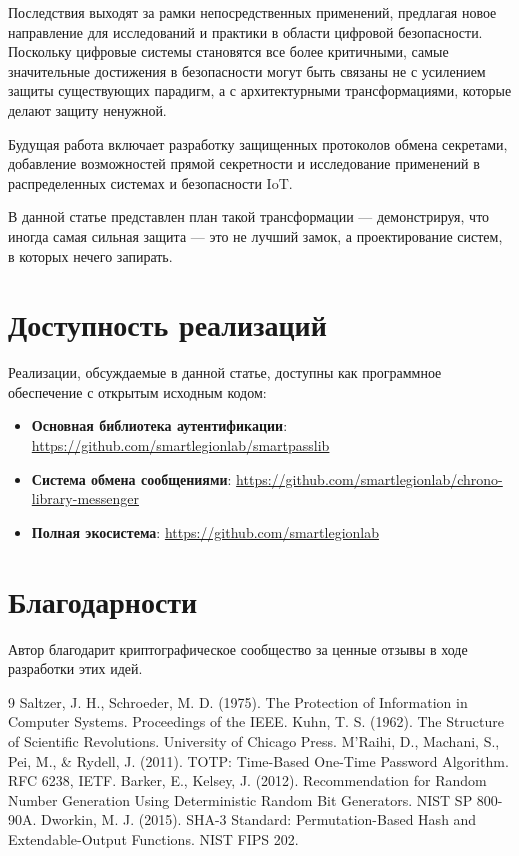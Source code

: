 \documentclass[11pt,a4paper]{article}
\begin{document}
Последствия выходят за рамки непосредственных применений, предлагая новое направление для исследований и практики в области цифровой безопасности. Поскольку цифровые системы становятся все более критичными, самые значительные достижения в безопасности могут быть связаны не с усилением защиты существующих парадигм, а с архитектурными трансформациями, которые делают защиту ненужной.

Будущая работа включает разработку защищенных протоколов обмена секретами, добавление возможностей прямой секретности и исследование применений в распределенных системах и безопасности IoT.

В данной статье представлен план такой трансформации — демонстрируя, что иногда самая сильная защита — это не лучший замок, а проектирование систем, в которых нечего запирать.

\section*{Доступность реализаций}

Реализации, обсуждаемые в данной статье, доступны как программное обеспечение с открытым исходным кодом:

\begin{itemize}
    \item \textbf{Основная библиотека аутентификации}: \url{https://github.com/smartlegionlab/smartpasslib}
    \item \textbf{Система обмена сообщениями}: \url{https://github.com/smartlegionlab/chrono-library-messenger}
    \item \textbf{Полная экосистема}: \url{https://github.com/smartlegionlab}
\end{itemize}

\section*{Благодарности}

Автор благодарит криптографическое сообщество за ценные отзывы в ходе разработки этих идей.

\begin{thebibliography}{9}
 Saltzer, J. H., Schroeder, M. D. (1975). The Protection of Information in Computer Systems. Proceedings of the IEEE.
 Kuhn, T. S. (1962). The Structure of Scientific Revolutions. University of Chicago Press.
 M'Raihi, D., Machani, S., Pei, M., \& Rydell, J. (2011). TOTP: Time-Based One-Time Password Algorithm. RFC 6238, IETF.
 Barker, E., Kelsey, J. (2012). Recommendation for Random Number Generation Using Deterministic Random Bit Generators. NIST SP 800-90A.
 Dworkin, M. J. (2015). SHA-3 Standard: Permutation-Based Hash and Extendable-Output Functions. NIST FIPS 202.
\end{thebibliography}
\end{document}
